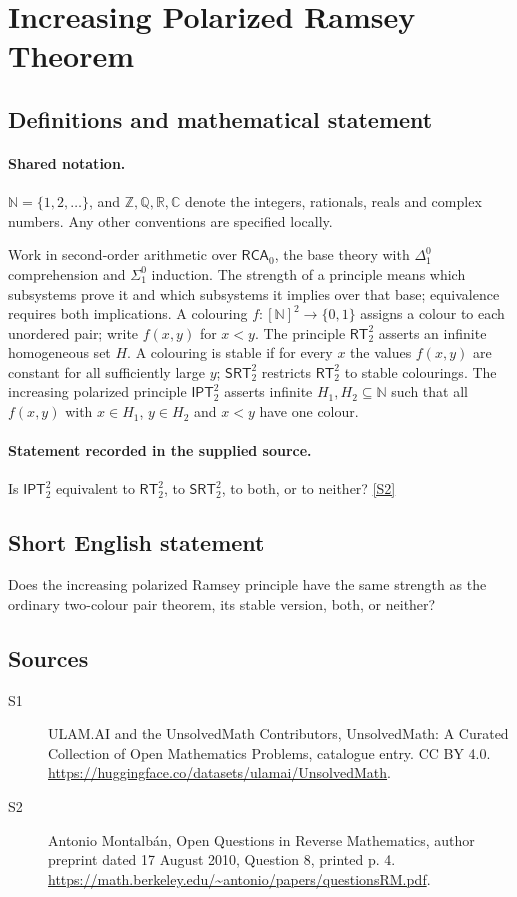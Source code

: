 \documentclass[11pt]{article}
\newcommand{\sref}[2]{\hyperlink{source:#1:#2}{[S#2]}}
\begin{document}
\section{Increasing Polarized Ramsey Theorem}\label{statement}

\subsection{Definitions and mathematical statement}

\paragraph{Shared notation.}$\mathbb N=\{1,2,\ldots\}$, and $\mathbb Z,\mathbb Q,\mathbb R,\mathbb C$ denote the integers, rationals, reals and complex numbers. Any other conventions are specified locally.


Work in second-order arithmetic over $\mathsf{RCA}_0$, the base theory with $\Delta^0_1$ comprehension and $\Sigma^0_1$ induction. The strength of a principle means which subsystems prove it and which subsystems it implies over that base; equivalence requires both implications. A colouring $f:[\mathbb N]^2\to\{0,1\}$ assigns a colour to each unordered pair; write $f(x,y)$ for $x<y$. The principle $\mathsf{RT}^2_2$ asserts an infinite homogeneous set $H$. A colouring is stable if for every $x$ the values $f(x,y)$ are constant for all sufficiently large $y$; $\mathsf{SRT}^2_2$ restricts $\mathsf{RT}^2_2$ to stable colourings. The increasing polarized principle $\mathsf{IPT}^2_2$ asserts infinite $H_1,H_2\subseteq\mathbb N$ such that all $f(x,y)$ with $x\in H_1$, $y\in H_2$ and $x<y$ have one colour.
\paragraph{Statement recorded in the supplied source.}
Is $\mathsf{IPT}^2_2$ equivalent to $\mathsf{RT}^2_2$, to $\mathsf{SRT}^2_2$, to both, or to neither? \sref{statement}{2}
\subsection{Short English statement}
Does the increasing polarized Ramsey principle have the same strength as the ordinary two-colour pair theorem, its stable version, both, or neither?
\subsection{Sources}
\begin{description}
\item[\hypertarget{source:statement:1}{S1}] ULAM.AI and the UnsolvedMath Contributors, UnsolvedMath: A Curated Collection of Open Mathematics Problems, catalogue entry. CC BY 4.0. \url{https://huggingface.co/datasets/ulamai/UnsolvedMath}.
\item[\hypertarget{source:statement:2}{S2}] Antonio Montalbán, Open Questions in Reverse Mathematics, author preprint dated 17 August 2010, Question 8, printed p. 4. \url{https://math.berkeley.edu/~antonio/papers/questionsRM.pdf}.
\end{description}
\label{end:statement}
\end{document}
